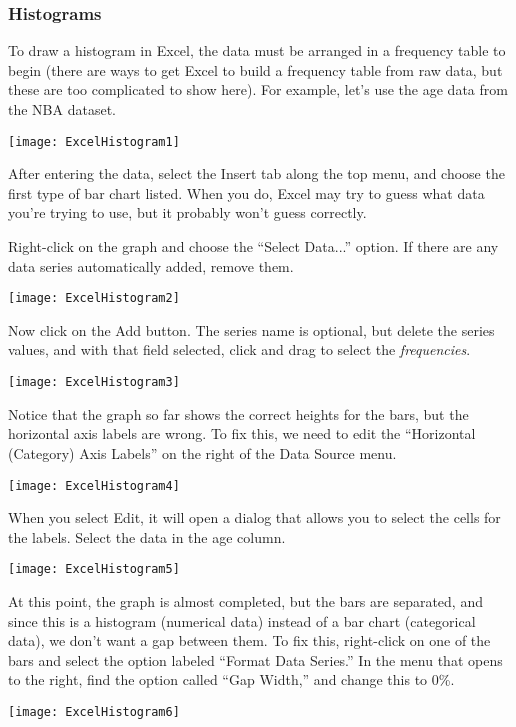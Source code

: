\subsubsection{Histograms}
To draw a histogram in Excel, the data must be arranged in a frequency table to begin (there are ways to get Excel to build a frequency table from raw data, but these are too complicated to show here).  For example, let's use the age data from the NBA dataset.
\begin{center}
\texttt{[image: ExcelHistogram1]}
\end{center}
After entering the data, select the Insert tab along the top menu, and choose the first type of bar chart listed.  When you do, Excel may try to guess what data you're trying to use, but it probably won't guess correctly.

Right-click on the graph and choose the ``Select Data...'' option.  If there are any data series automatically added, remove them.
\begin{center}
\texttt{[image: ExcelHistogram2]}
\end{center}
Now click on the Add button.  The series name is optional, but delete the series values, and with that field selected, click and drag to select the \emph{frequencies}.
\begin{center}
\texttt{[image: ExcelHistogram3]}
\end{center}

Notice that the graph so far shows the correct heights for the bars, but the horizontal axis labels are wrong.  To fix this, we need to edit the ``Horizontal (Category) Axis Labels'' on the right of the Data Source menu.
\begin{center}
\texttt{[image: ExcelHistogram4]}
\end{center}
When you select Edit, it will open a dialog that allows you to select the cells for the labels.  Select the data in the age column.
\begin{center}
\texttt{[image: ExcelHistogram5]}
\end{center}

At this point, the graph is almost completed, but the bars are separated, and since this is a histogram (numerical data) instead of a bar chart (categorical data), we don't want a gap between them.  To fix this, right-click on one of the bars and select the option labeled ``Format Data Series.'' In the menu that opens to the right, find the option called ``Gap Width,'' and change this to 0\%.
\begin{center}
\texttt{[image: ExcelHistogram6]}
\end{center}


